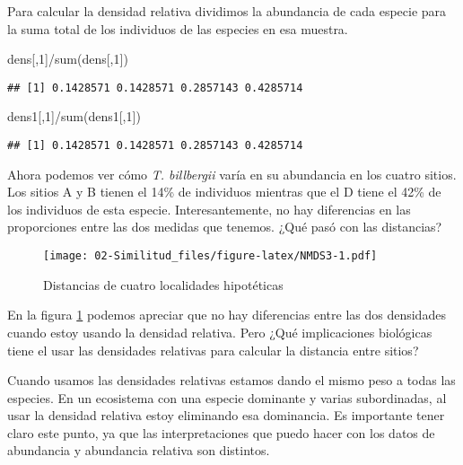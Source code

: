 \documentclass[
]{article}
\newenvironment{Shaded}{\begin{snugshade}}{\end{snugshade}}
\newcommand{\DecValTok}[1]{\textcolor[rgb]{0.00,0.00,0.81}{#1}}
\newcommand{\FunctionTok}[1]{\textcolor[rgb]{0.00,0.00,0.00}{#1}}
\newcommand{\NormalTok}[1]{#1}
\newcommand{\SpecialCharTok}[1]{\textcolor[rgb]{0.00,0.00,0.00}{#1}}
\begin{document}
Para calcular la densidad relativa dividimos la abundancia de cada especie para la suma total de los individuos de las especies en esa muestra.

\begin{Shaded}
\begin{Highlighting}[]
\NormalTok{dens[,}\DecValTok{1}\NormalTok{]}\SpecialCharTok{/}\FunctionTok{sum}\NormalTok{(dens[,}\DecValTok{1}\NormalTok{])}
\end{Highlighting}
\end{Shaded}

\begin{verbatim}
## [1] 0.1428571 0.1428571 0.2857143 0.4285714
\end{verbatim}

\begin{Shaded}
\begin{Highlighting}[]
\NormalTok{dens1[,}\DecValTok{1}\NormalTok{]}\SpecialCharTok{/}\FunctionTok{sum}\NormalTok{(dens1[,}\DecValTok{1}\NormalTok{])}
\end{Highlighting}
\end{Shaded}

\begin{verbatim}
## [1] 0.1428571 0.1428571 0.2857143 0.4285714
\end{verbatim}

Ahora podemos ver cómo \emph{T. billbergii} varía en su abundancia en los cuatro sitios. Los sitios A y B tienen el 14\% de individuos mientras que el D tiene el 42\% de los individuos de esta especie. Interesantemente, no hay diferencias en las proporciones entre las dos medidas que tenemos. ¿Qué pasó con las distancias?

\begin{figure}
\centering
\texttt{[image: 02-Similitud\_files/figure-latex/NMDS3-1.pdf]}
\caption{\label{fig:NMDS3}Distancias de cuatro localidades hipotéticas}
\end{figure}

En la figura \ref{fig:NMDS3} podemos apreciar que no hay diferencias entre las dos densidades cuando estoy usando la densidad relativa. Pero ¿Qué implicaciones biológicas tiene el usar las densidades relativas para calcular la distancia entre sitios?

Cuando usamos las densidades relativas estamos dando el mismo peso a todas las especies. En un ecosistema con una especie dominante y varias subordinadas, al usar la densidad relativa estoy eliminando esa dominancia. Es importante tener claro este punto, ya que las interpretaciones que puedo hacer con los datos de abundancia y abundancia relativa son distintos.
\end{document}
